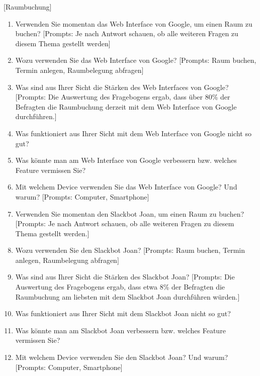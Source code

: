 [Raumbuchung]

\begin{enumerate}

    \item Verwenden Sie momentan das Web Interface von Google, um einen Raum zu buchen? [Prompts: Je nach Antwort schauen, ob alle weiteren Fragen zu diesem Thema gestellt werden]
    
    \item Wozu verwenden Sie das Web Interface von Google? [Prompts: Raum buchen, Termin anlegen, Raumbelegung abfragen]
    
    \item Was sind aus Ihrer Sicht die Stärken des Web Interfaces von Google? [Prompts: Die Auswertung des Fragebogens ergab, dass über 80\% der Befragten die Raumbuchung derzeit mit dem Web Interface von Google durchführen.]
    
    \item Was funktioniert aus Ihrer Sicht mit dem Web Interface von Google nicht so gut?
    
    \item Was könnte man am Web Interface von Google verbessern bzw. welches Feature vermissen Sie? 
    
    \item Mit welchem Device verwenden Sie das Web Interface von Google? Und warum? [Prompts: Computer, Smartphone] 
    
    \item Verwenden Sie momentan den Slackbot Joan, um einen Raum zu buchen? [Prompts: Je nach Antwort schauen, ob alle weiteren Fragen zu diesem Thema gestellt werden.]
    
    \item Wozu verwenden Sie den Slackbot Joan? [Prompts: Raum buchen, Termin anlegen, Raumbelegung abfragen]
    
    \item Was sind aus Ihrer Sicht die Stärken des Slackbot Joan? [Prompts: Die Auswertung des Fragebogens ergab, dass etwa 8\% der Befragten die Raumbuchung am liebsten mit dem Slackbot Joan durchführen würden.]
    
    \item Was funktioniert aus Ihrer Sicht mit dem Slackbot Joan nicht so gut?
    
    \item Was könnte man am Slackbot Joan verbessern bzw. welches Feature vermissen Sie? 
    
    \item Mit welchem Device verwenden Sie den Slackbot Joan? Und warum? [Prompts: Computer, Smartphone] 
    

\end{enumerate}
